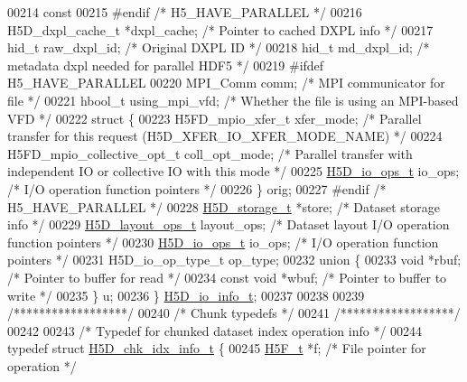 \begin{DoxyCode}
00214     \textcolor{keyword}{const}
00215 \textcolor{preprocessor}{#endif }\textcolor{comment}{/* H5\_HAVE\_PARALLEL */}\textcolor{preprocessor}{}
00216         H5D\_dxpl\_cache\_t *dxpl\_cache; \textcolor{comment}{/* Pointer to cached DXPL info */}
00217     hid\_t raw\_dxpl\_id;          \textcolor{comment}{/* Original DXPL ID */}
00218     hid\_t md\_dxpl\_id;           \textcolor{comment}{/* metadata dxpl needed for parallel HDF5 */}
00219 \textcolor{preprocessor}{#ifdef H5\_HAVE\_PARALLEL}
00220     MPI\_Comm comm;              \textcolor{comment}{/* MPI communicator for file */}
00221     hbool\_t using\_mpi\_vfd;      \textcolor{comment}{/* Whether the file is using an MPI-based VFD */}
00222     \textcolor{keyword}{struct }\{
00223         H5FD\_mpio\_xfer\_t xfer\_mode; \textcolor{comment}{/* Parallel transfer for this request (H5D\_XFER\_IO\_XFER\_MODE\_NAME) */}
00224         H5FD\_mpio\_collective\_opt\_t coll\_opt\_mode; \textcolor{comment}{/* Parallel transfer with independent IO or collective IO
       with this mode */}
00225         \hyperlink{struct_h5_d__io__ops__t}{H5D\_io\_ops\_t} io\_ops;    \textcolor{comment}{/* I/O operation function pointers */}
00226     \} orig;
00227 \textcolor{preprocessor}{#endif }\textcolor{comment}{/* H5\_HAVE\_PARALLEL */}\textcolor{preprocessor}{}
00228     \hyperlink{union_h5_d__storage__t}{H5D\_storage\_t} *store;       \textcolor{comment}{/* Dataset storage info */}
00229     \hyperlink{struct_h5_d__layout__ops__t}{H5D\_layout\_ops\_t} layout\_ops;    \textcolor{comment}{/* Dataset layout I/O operation function pointers */}
00230     \hyperlink{struct_h5_d__io__ops__t}{H5D\_io\_ops\_t} io\_ops;        \textcolor{comment}{/* I/O operation function pointers */}
00231     H5D\_io\_op\_type\_t op\_type;
00232     \textcolor{keyword}{union }\{
00233         \textcolor{keywordtype}{void} *rbuf;             \textcolor{comment}{/* Pointer to buffer for read */}
00234         \textcolor{keyword}{const} \textcolor{keywordtype}{void} *wbuf;       \textcolor{comment}{/* Pointer to buffer to write */}
00235     \} u;
00236 \} \hyperlink{struct_h5_d__io__info__t}{H5D\_io\_info\_t};
00237 
00238 
00239 \textcolor{comment}{/******************/}
00240 \textcolor{comment}{/* Chunk typedefs */}
00241 \textcolor{comment}{/******************/}
00242 
00243 \textcolor{comment}{/* Typedef for chunked dataset index operation info */}
00244 \textcolor{keyword}{typedef} \textcolor{keyword}{struct }\hyperlink{struct_h5_d__chk__idx__info__t}{H5D\_chk\_idx\_info\_t} \{
00245     \hyperlink{struct_h5_f__t}{H5F\_t} *f;                   \textcolor{comment}{/* File pointer for operation */}

\end{DoxyCode}

